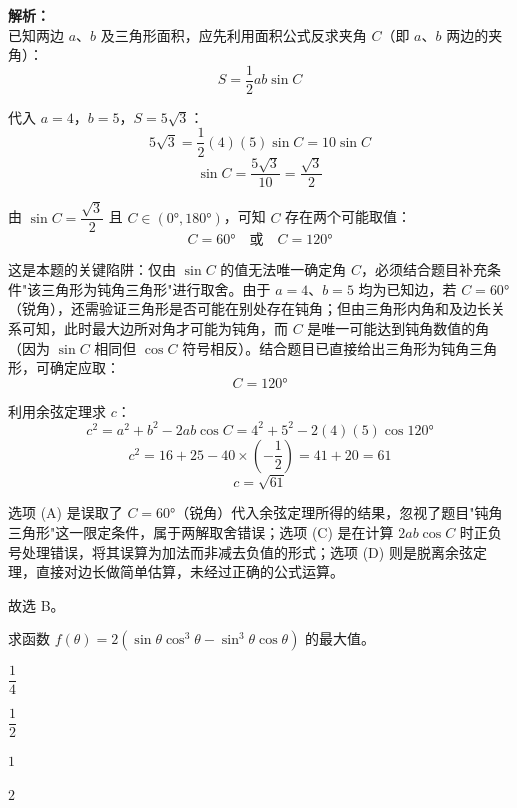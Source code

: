 \documentclass[12pt,a4paper]{exam-zh}
\begin{document}
\begin{solution}
    \textbf{解析：} \\
    已知两边 $a$、$b$ 及三角形面积，应先利用面积公式反求夹角 $C$（即 $a$、$b$ 两边的夹角）：
    \[ \displaystyle S = \frac{1}{2}ab\sin C \]

    代入 $a=4$，$b=5$，$S=5\sqrt{3}$：
    \[ \displaystyle 5\sqrt{3} = \frac{1}{2}(4)(5)\sin C = 10\sin C \]
    \[ \displaystyle \sin C = \frac{5\sqrt{3}}{10} = \frac{\sqrt{3}}{2} \]

    由 $\sin C = \dfrac{\sqrt3}{2}$ 且 $C \in (0°, 180°)$，可知 $C$ 存在两个可能取值：
    \[ \displaystyle C = 60° \quad \text{或} \quad C = 120° \]

    这是本题的关键陷阱：仅由 $\sin C$ 的值无法唯一确定角 $C$，必须结合题目补充条件"该三角形为钝角三角形"进行取舍。由于 $a=4$、$b=5$ 均为已知边，若 $C=60°$（锐角），还需验证三角形是否可能在别处存在钝角；但由三角形内角和及边长关系可知，此时最大边所对角才可能为钝角，而 $C$ 是唯一可能达到钝角数值的角（因为 $\sin C$ 相同但 $\cos C$ 符号相反）。结合题目已直接给出三角形为钝角三角形，可确定应取：
    \[ \displaystyle C = 120° \]

    利用余弦定理求 $c$：
    \[ \displaystyle c^2 = a^2 + b^2 - 2ab\cos C = 4^2 + 5^2 - 2(4)(5)\cos 120° \]
    \[ \displaystyle c^2 = 16 + 25 - 40 \times \left(-\frac{1}{2}\right) = 41 + 20 = 61 \]
    \[ \displaystyle c = \sqrt{61} \]

    选项 (A) 是误取了 $C=60°$（锐角）代入余弦定理所得的结果，忽视了题目"钝角三角形"这一限定条件，属于两解取舍错误；选项 (C) 是在计算 $2ab\cos C$ 时正负号处理错误，将其误算为加法而非减去负值的形式；选项 (D) 则是脱离余弦定理，直接对边长做简单估算，未经过正确的公式运算。

    故选 B。
\end{solution}


\begin{question}
    求函数 $f(\theta) = 2\left(\sin\theta\cos^3\theta - \sin^3\theta\cos\theta\right)$ 的最大值。 \paren[B]
    \begin{choices}
        \item $\dfrac{1}{4}$
        \item $\dfrac{1}{2}$
        \item $1$
        \item $2$
    \end{choices}
\end{question}
\end{document}
